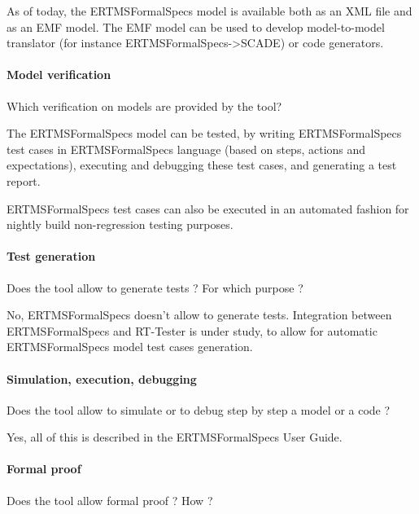 \begin{author_comment}
As of today, the ERTMSFormalSpecs model is available both as an XML file and as an EMF model. The EMF model can be used to develop model-to-model translator (for instance ERTMSFormalSpecs->SCADE) or code generators.
\end{author_comment}

\paragraph{Model verification}
Which verification on models are provided by the tool?

\begin{author_comment}
The ERTMSFormalSpecs model can be tested, by writing ERTMSFormalSpecs test cases in ERTMSFormalSpecs language (based on steps, actions and expectations), executing and debugging these test cases, and generating a test report. 

ERTMSFormalSpecs test cases can also be executed in an automated fashion for nightly build non-regression testing purposes.
\end{author_comment}

\paragraph{Test generation}
Does the tool allow to generate tests ? For  which purpose ?

\begin{author_comment}
No, ERTMSFormalSpecs doesn't allow to generate tests. Integration between ERTMSFormalSpecs and RT-Tester is under study, to allow for automatic ERTMSFormalSpecs model test cases generation.
\end{author_comment}

\paragraph{Simulation, execution, debugging}
Does the tool allow to simulate or to debug step by step a model or a code ?

\begin{author_comment}
Yes, all of this is described in the ERTMSFormalSpecs User Guide.
\end{author_comment}

\paragraph{Formal proof}
Does the tool allow formal proof ?  How ?

